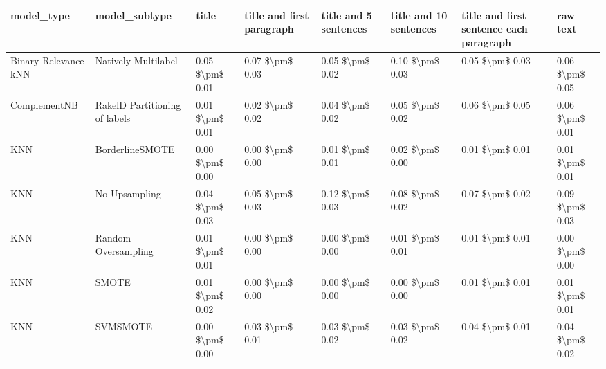 \begin{tabular}{llllllll}
\toprule
                     model\_type &                 model\_subtype &           title & title and first paragraph & title and 5 sentences & title and 10 sentences & title and first sentence each paragraph &            raw text \\
\midrule
           Binary Relevance kNN &           Natively Multilabel & 0.05 \$\textbackslash pm\$ 0.01 &           0.07 \$\textbackslash pm\$ 0.03 &       0.05 \$\textbackslash pm\$ 0.02 &        0.10 \$\textbackslash pm\$ 0.03 &                         0.05 \$\textbackslash pm\$ 0.03 &     0.06 \$\textbackslash pm\$ 0.05 \\
                   ComplementNB & RakelD Partitioning of labels & 0.01 \$\textbackslash pm\$ 0.01 &           0.02 \$\textbackslash pm\$ 0.02 &       0.04 \$\textbackslash pm\$ 0.02 &        0.05 \$\textbackslash pm\$ 0.02 &                         0.06 \$\textbackslash pm\$ 0.05 &     0.06 \$\textbackslash pm\$ 0.01 \\
                            KNN &               BorderlineSMOTE & 0.00 \$\textbackslash pm\$ 0.00 &           0.00 \$\textbackslash pm\$ 0.00 &       0.01 \$\textbackslash pm\$ 0.01 &        0.02 \$\textbackslash pm\$ 0.00 &                         0.01 \$\textbackslash pm\$ 0.01 &     0.01 \$\textbackslash pm\$ 0.01 \\
                            KNN &                 No Upsampling & 0.04 \$\textbackslash pm\$ 0.03 &           0.05 \$\textbackslash pm\$ 0.03 &       0.12 \$\textbackslash pm\$ 0.03 &        0.08 \$\textbackslash pm\$ 0.02 &                         0.07 \$\textbackslash pm\$ 0.02 &     0.09 \$\textbackslash pm\$ 0.03 \\
                            KNN &           Random Oversampling & 0.01 \$\textbackslash pm\$ 0.01 &           0.00 \$\textbackslash pm\$ 0.00 &       0.00 \$\textbackslash pm\$ 0.00 &        0.01 \$\textbackslash pm\$ 0.01 &                         0.01 \$\textbackslash pm\$ 0.01 &     0.00 \$\textbackslash pm\$ 0.00 \\
                            KNN &                         SMOTE & 0.01 \$\textbackslash pm\$ 0.02 &           0.00 \$\textbackslash pm\$ 0.00 &       0.00 \$\textbackslash pm\$ 0.00 &        0.00 \$\textbackslash pm\$ 0.00 &                         0.01 \$\textbackslash pm\$ 0.01 &     0.01 \$\textbackslash pm\$ 0.01 \\
                            KNN &                      SVMSMOTE & 0.00 \$\textbackslash pm\$ 0.00 &           0.03 \$\textbackslash pm\$ 0.01 &       0.03 \$\textbackslash pm\$ 0.02 &        0.03 \$\textbackslash pm\$ 0.02 &                         0.04 \$\textbackslash pm\$ 0.01 &     0.04 \$\textbackslash pm\$ 0.02 \\

\end{tabular}
